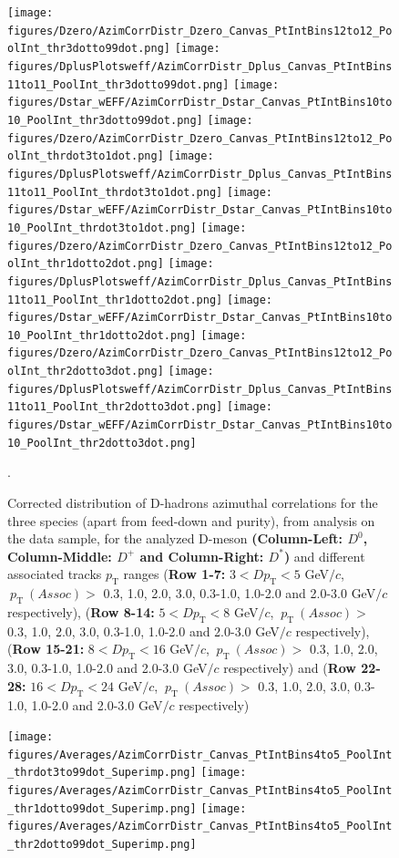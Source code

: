 \begin{figure}[!htbp]
\centering
{\texttt{[image: figures/Dzero/AzimCorrDistr\_Dzero\_Canvas\_PtIntBins12to12\_PoolInt\_thr3dotto99dot.png]}} 
{\texttt{[image: figures/DplusPlotsweff/AzimCorrDistr\_Dplus\_Canvas\_PtIntBins11to11\_PoolInt\_thr3dotto99dot.png]}} 
{\texttt{[image: figures/Dstar\_wEFF/AzimCorrDistr\_Dstar\_Canvas\_PtIntBins10to10\_PoolInt\_thr3dotto99dot.png]}}
{\texttt{[image: figures/Dzero/AzimCorrDistr\_Dzero\_Canvas\_PtIntBins12to12\_PoolInt\_thrdot3to1dot.png]}} 
{\texttt{[image: figures/DplusPlotsweff/AzimCorrDistr\_Dplus\_Canvas\_PtIntBins11to11\_PoolInt\_thrdot3to1dot.png]}} 
{\texttt{[image: figures/Dstar\_wEFF/AzimCorrDistr\_Dstar\_Canvas\_PtIntBins10to10\_PoolInt\_thrdot3to1dot.png]}}
{\texttt{[image: figures/Dzero/AzimCorrDistr\_Dzero\_Canvas\_PtIntBins12to12\_PoolInt\_thr1dotto2dot.png]}} 
{\texttt{[image: figures/DplusPlotsweff/AzimCorrDistr\_Dplus\_Canvas\_PtIntBins11to11\_PoolInt\_thr1dotto2dot.png]}} 
{\texttt{[image: figures/Dstar\_wEFF/AzimCorrDistr\_Dstar\_Canvas\_PtIntBins10to10\_PoolInt\_thr1dotto2dot.png]}}
{\texttt{[image: figures/Dzero/AzimCorrDistr\_Dzero\_Canvas\_PtIntBins12to12\_PoolInt\_thr2dotto3dot.png]}} 
{\texttt{[image: figures/DplusPlotsweff/AzimCorrDistr\_Dplus\_Canvas\_PtIntBins11to11\_PoolInt\_thr2dotto3dot.png]}} 
{\texttt{[image: figures/Dstar\_wEFF/AzimCorrDistr\_Dstar\_Canvas\_PtIntBins10to10\_PoolInt\_thr2dotto3dot.png]}}
\caption{Corrected distribution of D-hadrons azimuthal correlations for the three species (apart from feed-down and purity), from analysis on the data sample, for the analyzed D-meson \textbf{(Column-Left: $D^0$, Column-Middle: $D^+$ and Column-Right: $D^*$)} and different associated tracks $p_\text{T}$ ranges (\textbf{Row 1-7:} $3 < D p_\text{T} < 5$ GeV$/c$, $ \ p_\text{T}~(Assoc)>$ 0.3, 1.0, 2.0, 3.0, 0.3-1.0, 1.0-2.0 and 2.0-3.0 GeV$/c$ respectively), (\textbf{Row 8-14:} $5 < D p_\text{T} < 8$ GeV$/c$, $ \ p_\text{T}~(Assoc)>$ 0.3, 1.0, 2.0, 3.0, 0.3-1.0, 1.0-2.0 and 2.0-3.0 GeV$/c$ respectively),(\textbf{Row 15-21:} $8 < D p_\text{T} < 16$ GeV$/c$, $ \ p_\text{T}~(Assoc)>$ 0.3, 1.0, 2.0, 3.0, 0.3-1.0, 1.0-2.0 and 2.0-3.0 GeV$/c$ respectively) and (\textbf{Row 22-28:} $16 < D p_\text{T} < 24$ GeV$/c$, $ \ p_\text{T}~(Assoc)>$ 0.3, 1.0, 2.0, 3.0, 0.3-1.0, 1.0-2.0 and 2.0-3.0 GeV$/c$ respectively) }.
\label{fig:DataD0DpDs}
\end{figure}
\begin{figure}[!htbp]
\centering
{\texttt{[image: figures/Averages/AzimCorrDistr\_Canvas\_PtIntBins4to5\_PoolInt\_thrdot3to99dot\_Superimp.png]}}
{\texttt{[image: figures/Averages/AzimCorrDistr\_Canvas\_PtIntBins4to5\_PoolInt\_thr1dotto99dot\_Superimp.png]}}
{\texttt{[image: figures/Averages/AzimCorrDistr\_Canvas\_PtIntBins4to5\_PoolInt\_thr2dotto99dot\_Superimp.png]}}
\end{figure}
